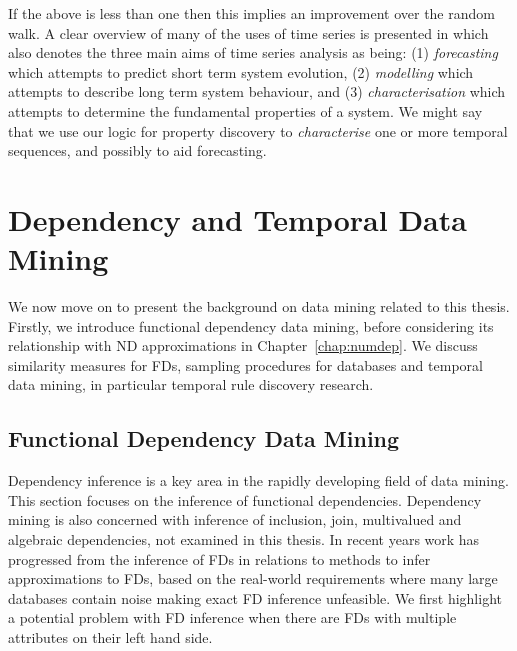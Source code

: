 If the above is less than one then this implies an improvement over
the random walk.  A clear overview of many of the uses of time series
is presented in \cite{wg94} which
also denotes the three main aims of time series analysis as being:
 (1) {\em forecasting } which attempts to predict short term system
evolution, (2) {\em modelling} which attempts to describe long term
system behaviour, and (3) {\em characterisation} which attempts to
determine the fundamental properties of a system. We might say that we
use our logic for property discovery to {\em characterise} one or more temporal
sequences, and possibly to aid forecasting. 


\section{Dependency and Temporal Data Mining}\label{sec:datmin}


We now move on to present the background on data mining related to
this thesis. Firstly, we introduce functional dependency data mining,
before considering its relationship with ND approximations in Chapter~\ref{chap:numdep}. We discuss similarity
measures for FDs, sampling procedures for databases and temporal data
mining, in particular temporal rule discovery research.


\subsection{Functional Dependency Data Mining}\label{subsec:fdmining}	

Dependency inference is a key area in the rapidly developing field of
data mining. This section focuses on the inference of functional dependencies. 
Dependency mining is also concerned with inference of inclusion, join,
multivalued and algebraic dependencies, not examined in 
this thesis. In recent years work has progressed from the inference of
FDs in relations to methods to infer approximations to FDs, based on
the real-world requirements where many large databases contain noise
making exact FD inference unfeasible. We first highlight a potential
problem with FD inference when there are FDs with multiple
attributes on their left hand side.


